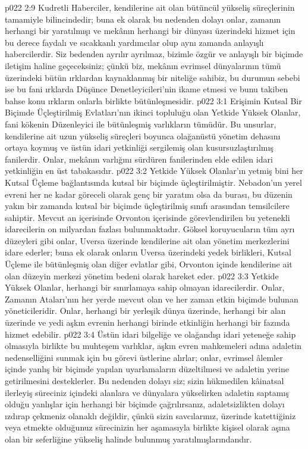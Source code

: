 \vs p022 2:9 Kudretli Haberciler, kendilerine ait olan bütüncül yükseliş süreçlerinin tamamiyle bilincindedir; buna ek olarak bu nedenden dolayı onlar, zamanın herhangi bir yaratılmışı ve mekânın herhangi bir dünyası üzerindeki hizmet için bu derece faydalı ve sıcakkanlı yardımcılar olup aynı zamanda anlayışlı habercilerdir. Siz bedenden ayrılır ayrılmaz, bizimle özgür ve anlayışlı bir biçimde iletişim haline geçeceksiniz; çünkü biz, mekânın evrimsel dünyalarının tümü üzerindeki bütün ırklardan kaynaklanmış bir niteliğe sahibiz, bu durumun sebebi ise bu fani ırklarda Düşünce Denetleyicileri’nin ikame etmesi ve bunu takiben bahse konu ırkların onlarla birlikte bütünleşmesidir.
\vs p022 3:1 Erişimin Kutsal Bir Biçimde Üçleştirilmiş Evlatları’nın ikinci topluluğu olan Yetkide Yüksek Olanlar, fani kökenin Düzenleyici ile bütünleşmiş varlıkların tümüdür. Bu unsurlar, kendilerine ait uzun yükseliş süreçleri boyunca olağanüstü yönetim dehasını ortaya koymuş ve üstün idari yetkinliği sergilemiş olan kusursuzlaştırılmış fanilerdir. Onlar, mekânın varlığını sürdüren fanilerinden elde edilen idari yetkinliğin en üst tabakasıdır.
\vs p022 3:2 Yetkide Yüksek Olanlar’ın yetmiş bini her Kutsal Üçleme bağlantısında kutsal bir biçimde üçleştirilmiştir. Nebadon’un yerel evreni her ne kadar göreceli olarak genç bir yaratım olsa da burası, bu düzenin yakın bir zamanda kutsal bir biçimde üçleştirilmiş sınıfı arasından temsilcilere sahiptir. Mevcut an içerisinde Orvonton içerisinde görevlendirilen bu yetenekli idarecilerin on milyardan fazlası bulunmaktadır. Göksel koruyucuların tüm ayrı düzeyleri gibi onlar, Uversa üzerinde kendilerine ait olan yönetim merkezlerini idare ederler; buna ek olarak onların Uversa üzerindeki yedek birlikleri, Kutsal Üçleme ile bütünleşmiş olan diğer evlatlar gibi, Orvonton içinde kendilerine ait olan düzeyin merkezi yönetim bedeni olarak hareket eder.
\vs p022 3:3 Yetkide Yüksek Olanlar, herhangi bir sınırlamaya sahip olmayan idarecilerdir. Onlar, Zamanın Ataları’nın her yerde mevcut olan ve her zaman etkin biçimde bulunan yöneticileridir. Onlar, herhangi bir yerleşik dünya üzerinde, herhangi bir alan üzerinde ve yedi aşkın evrenin herhangi birinde etkinliğin herhangi bir fazında hizmet edebilir.
\vs p022 3:4 Üstün idari bilgeliğe ve olağandışı idari yeteneğe sahip olmasıyla birlikte bu muhteşem varlıklar, aşkın evren mahkemeleri adına adaletin nedenselliğini sunmak için bu görevi üstlerine alırlar; onlar, evrimsel âlemler içinde yanlış bir biçimde yapılan uyarlamaların düzeltilmesi ve adaletin yerine getirilmesini desteklerler. Bu nedenden dolayı siz; sizin hükmedilen kâinatsal ilerleyiş süreciniz içindeki alanlara ve dünyalara yükselirken adaletin saptamış olduğu yanlışlar için herhangi bir biçimde çağrılırsanız, adaletsizlikten dolayı ızdırap çekmeniz olanaklı değildir, çünkü sizin savcılarınız, üzerinde katettiğiniz veya etmekte olduğunuz sürecinizin her aşamasıyla birlikte kişisel olarak aşına olan bir seferliğine yükseliş halinde bulunmuş yaratılmışlarındandır.
